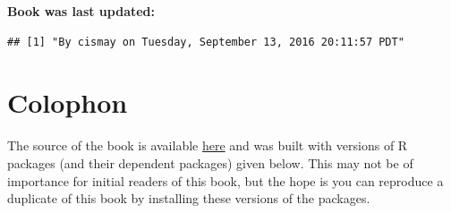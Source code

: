 \documentclass[]{tufte-book}
\begin{document}
\textbf{Book was last updated:}

\begin{verbatim}
## [1] "By cismay on Tuesday, September 13, 2016 20:11:57 PDT"
\end{verbatim}

\section*{Colophon}\label{colophon}

The source of the book is available
\href{https://github.com/ismayc/moderndiver-book}{here} and was built
with versions of R packages (and their dependent packages) given below.
This may not be of importance for initial readers of this book, but the
hope is you can reproduce a duplicate of this book by installing these
versions of the packages.
\end{document}
